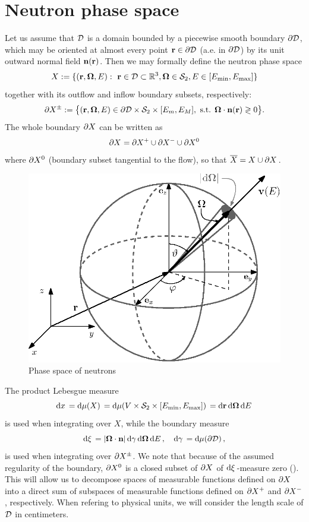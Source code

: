 \section{Neutron phase space} \label{sec:phase}
Let us assume that $\VV$ is a domain bounded by a piecewise smooth boundary $\pV$, which may be oriented at almost every
point $\br\in\pV$ (a.e. in $\pV$) by its unit outward normal field $\bn(\br)$. 
Then we may formally define the neutron phase space 
$$
  X := \{(\br,\bomega,E):\ \br\in \VV\subset\R[3], \bomega\in \Sphere, E \in [\Emin,\Emax]\}
$$
together with its outflow and inflow boundary subsets, respectively:
$$
  \pX[\pm] := \bigl\{ (\br,\bomega,E) \in \pV \times \Sphere \times [E_m, E_M], \mbox{ s.t. } \bomega\cdot\bn(\br)
  \gtrless 0 \bigr\}.
$$
The whole boundary $\pX$ can be written as
$$
	\pX = \pX[+]\cup \pX[-] \cup \pX[0]
$$
where $\pX[0]$ (boundary subset tangential to the flow), so that $\overline X = X \cup \pX$.  
\begin{figure}[!hbt]
    \centering
    \includegraphics[scale=1]{phase_space.eps}
    \caption[Phase space of neutrons]{Phase space of neutrons}
    \label{fig:phase_space}
\end{figure}%
The product Lebesgue measure
\begin{equation}\label{eq:measure}
  \d{x} = \d{\mu(X)} = \d{\mu(V\times\Sphere\times [\Emin,\Emax])} = \d{\br}\d{\bomega}\d{E}
\end{equation}
is used when integrating over $X$, 
while the boundary measure
\begin{equation}\label{eq:measure2}
\db = \abs{\bomega\cdot\bn}\d{\gamma}\d{\bomega}\d{E},\quad \d{\gamma} = \d{\mu(\pV)},
\end{equation}
is used when integrating over $\pX[\pm]$. We note that because of the assumed regularity of the boundary, $\pX[0]$ is a
closed subset of $\pX$ of $\db$-measure zero (\cite[Chap. XXI, Sec. 2.2]{DautrayLions}). This will allow us to decompose
spaces of measurable functions defined on $\pX$ into a direct sum of subspaces of measurable functions defined on
$\pX[+]$ and $\pX[-]$, respectively. When refering to physical units, we will consider the length scale of $\VV$ in
centimeters.

